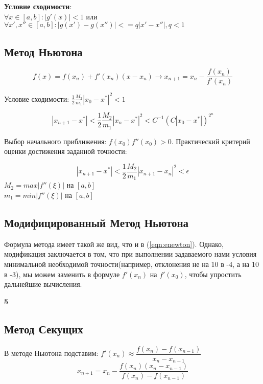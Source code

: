 \documentclass[a4paper,12pt]{article}
\begin{document}
\textbf{Условие сходимости}: \\
$\forall x \in [a, b]: |g'(x)| < 1$ или $\forall x', x'' \in [a, b]: |g(x') - g(x'')| <= q|x' - x''|, q < 1$
\vspace{1.5cm}


\subsection{Метод Ньютона}\label{newton}
\begin{equation}
f(x) = f(x_n) + f'(x_n)(x - x_n) \to x_{n+1} = x_n - \frac{f(x_n)}{f'(x_n)}
\label{eqn:enewton}
\end{equation}

Условие сходимости: $\frac{1}{2} \frac{M_2}{m_1} |x_0 - x^*|^2 < 1$

$$
|x_{n+1} - x^*| < \frac{1}{2}\frac{M_2}{m_1}|x_n - x^*|^2 < C^{-1}(C|x_0 - x^*|)^{2^n}
$$

Выбор начального приближения: $f(x_0)f''(x_0) > 0$.
Практический критерий оценки достижения заданной точности:

$$
|x_{n+1} - x^*| < \frac{1}{2}\frac{M_2}{m_1}|x_{n+1} - x_n|^2 < \epsilon
$$
$M_2 = max|f''(\xi)|$ на $[a,b]$ \\
$m_1 = min|f''(\xi)|$ на $[a,b]$

\vspace{1.5cm}
\subsection{Модифицированный Метод Ньютона}\label{mod_newton}
Формула метода имеет такой же вид, что и в (\ref{eqn:enewton}). Однако, модификация заключается в том, что при выполнении задаваемого нами условия минимальной необходимой точности(например, отклонения не на 10 в -4, а на 10 в -3), мы можем заменить в формуле $f'(x_n)$ на $f'(x_0)$, чтобы упростить дальнейшие вычисления.
\newpage

\begin{center}
{\bf5}\\
\vspace{0.5cm}
\end{center}
\setcounter{page}{5}
\subsection{Метод Секущих}\label{secant}
В методе Ньютона подставим: $f'(x_n) \approx \dfrac{f(x_n) - f(x_{n-1})}{x_n - x_{n-1}}$
\begin{equation}
 x_{n+1} = x_n - \frac{f(x_n)(x_n - x_{n-1})}{f(x_n) - f(x_{n-1})}
\label{eqn:esecant}
\end{equation}
\end{document}
